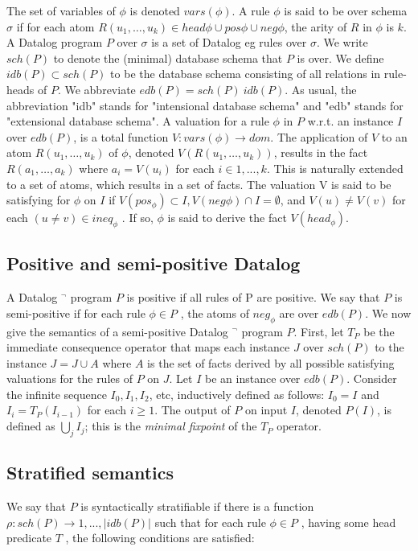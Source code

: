 \documentclass{pracamgr}
\theoremstyle{plain}
\theoremstyle{definition}
\theoremstyle{remark}
\begin{document}
The set of variables of $\phi$ is denoted $vars(\phi)$. A rule $\phi$ is
said to be over schema $\sigma$ if for each atom $R(u_1 , \dots , u_k ) \in
{head \phi } \cup pos \phi \cup neg \phi$, the arity of $R$ in $\phi$ is $k$. A Datalog program $P$ over $\sigma$ is a set of Datalog 
eg rules over $\sigma$. We write
$sch(P)$ to denote the (minimal) database schema that $P$ is
over. We define $idb(P ) \subset sch(P )$ to be the database schema
consisting of all relations in rule-heads of $P$. We abbreviate
$edb(P ) = sch(P ) \ idb(P )$. As usual, the abbreviation "idb"
stands for "intensional database schema" and "edb" stands
for "extensional database schema". A valuation for a rule
$\phi$ in $P$ w.r.t. an instance $I$ over $edb(P)$, is a total function
$V : vars(\phi) \to dom$. The application of $V$ to an atom
$R(u_1 , \dots , u_k)$ of $\phi$, denoted $V(R(u_1 , \dots, u_k ))$, results in the
fact $R(a_1 ,\dots, a_k )$ where $a_i = V (u_i )$ for each $i \in {1, . . . , k}$.
This is naturally extended to a set of atoms, which results
in a set of facts. The valuation V is said to be satisfying for
$\phi$ on $I$ if $V (pos_\phi ) \subset I, V (neg \phi ) \cap I = \emptyset$, and $V (u) \ne V (v)$ for each $(u \ne v) \in ineq_\phi$ . If so, $\phi$ is said to derive the fact $V (head_\phi )$.


\subsection{Positive and semi-positive Datalog}

A Datalog $^\neg$ program $P$ is positive if all rules of P are positive. We say
that $P$ is semi-positive if for each rule $\phi \in P$ , the atoms
of $neg_\phi$ are over $edb(P )$. We now give the semantics of a
semi-positive Datalog $^\neg$ program $P$. First, let $T_P$ be the
immediate consequence operator that maps each instance $J$
over $sch(P )$ to the instance $J = J \cup A$ where $A$ is the set
of facts derived by all possible satisfying valuations for the
rules of $P$ on $J$. Let $I$ be an instance over $edb(P )$. Consider
the infinite sequence $I_0 , I_1 , I_2 $, etc, inductively defined as
follows: $I_0 = I$ and $I_i = T_P(I_{i-1})$ for each $i \ge 1$. The output of $P$ on input $I$, denoted $P(I)$, is defined as $\bigcup_j I_j$; this
is the \emph{minimal fixpoint} of the $T_P$ operator.


\subsection{Stratified semantics} We say that $P$ is syntactically stratifiable if there is a function $\rho : sch(P ) \to {1, . . . , |idb(P )|}$
such that for each rule $\phi \in P$ , having some head predicate
$T$ , the following conditions are satisfied: 
\end{document}
